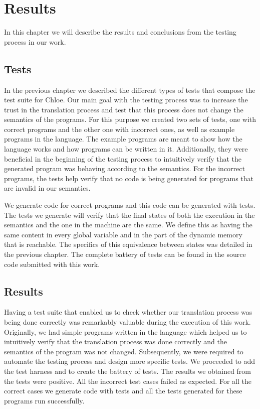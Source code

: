 \chapter{Results}\label{chapter:results}

In this chapter we will describe the results and conclusions from the testing process in our work.

\section{Tests}

In the previous chapter we described the different types of tests that compose the test suite for Chloe.
Our main goal with the testing process was to increase the trust in the translation process and test that this process does not change the semantics of the programs.
For this purpose we created two sets of tests, one with correct programs and the other one with incorrect ones, as well as example programs in the language.
The example programs are meant to show how the language works and how programs can be written in it.
Additionally, they were beneficial in the beginning of the testing process to intuitively verify that the generated program was behaving according to the semantics.
For the incorrect programs, the tests help verify that no code is being generated for programs that are invalid in our semantics.

We generate code for correct programs and this code can be generated with tests.
The tests we generate will verify that the final states of both the execution in the semantics and the one in the machine are the same.
We define this as having the same content in every global variable and in the part of the dynamic memory that is reachable.
The specifics of this equivalence between states was detailed in the previous chapter.
The complete battery of tests can be found in the source code submitted with this work.

\section{Results}

Having a test suite that enabled us to check whether our translation process was being done correctly was remarkably valuable during the execution of this work.
Originally, we had simple programs written in the language which helped us to intuitively verify that the translation process was done correctly and the semantics of the program was not changed.
Subsequently, we were required to automate the testing process and design more specific tests.
We proceeded to add the test harness and to create the battery of tests.
The results we obtained from the tests were positive.
All the incorrect test cases failed as expected.
For all the correct cases we generate code with tests and all the tests generated for these programs run successfully.

